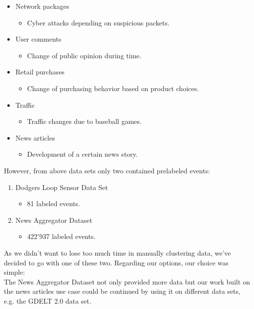 \begin{itemize}
    \item Network packages
        \begin{itemize}
            \item Cyber attacks depending on suspicious packets.
        \end{itemize}
    \item User comments
        \begin{itemize}
            \item Change of public opinion during time.
        \end{itemize}
    \item Retail purchases
        \begin{itemize}
            \item Change of purchasing behavior based on product choices.
        \end{itemize}
    \item Traffic
        \begin{itemize}
            \item Traffic changes due to baseball games.
        \end{itemize}
    \item News articles
        \begin{itemize}
            \item Development of a certain news story.
        \end{itemize}
\end{itemize}

However, from above data sets only two contained prelabeled events:

\begin{enumerate}
    \item Dodgers Loop Sensor Data Set
        \begin{itemize}
            \item 81 labeled events. %
        \end{itemize}
    \item News Aggregator Dataset
        \begin{itemize}
            \item 422'937 labeled events. %
        \end{itemize}
\end{enumerate}

As we didn't want to lose too much time in manually clustering data, we've decided to go with one of these two.
Regarding our options, our choice was simple:\\
The News Aggregator Dataset not only provided more data but our work built on the news articles use case could
be continued by using it on different data sets, e.g. the GDELT 2.0 data set.


